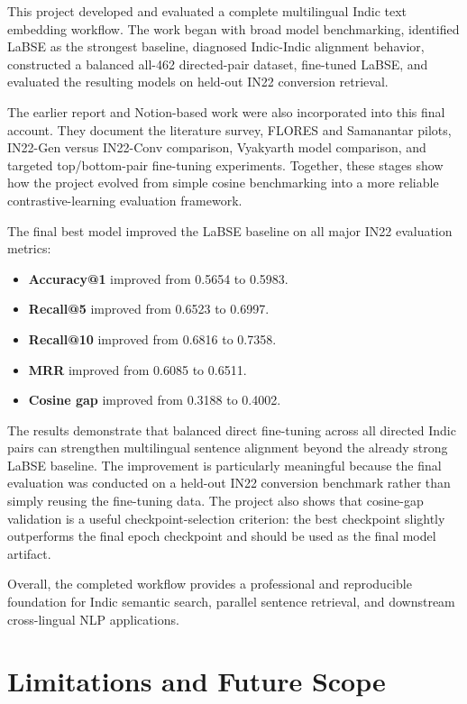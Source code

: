 \documentclass[12pt, a4paper]{article}
\begin{document}
This project developed and evaluated a complete multilingual Indic text embedding workflow. The work began with broad model benchmarking, identified LaBSE as the strongest baseline, diagnosed Indic-Indic alignment behavior, constructed a balanced all-462 directed-pair dataset, fine-tuned LaBSE, and evaluated the resulting models on held-out IN22 conversion retrieval.

The earlier report and Notion-based work were also incorporated into this final account. They document the literature survey, FLORES and Samanantar pilots, IN22-Gen versus IN22-Conv comparison, Vyakyarth model comparison, and targeted top/bottom-pair fine-tuning experiments. Together, these stages show how the project evolved from simple cosine benchmarking into a more reliable contrastive-learning evaluation framework.

The final best model improved the LaBSE baseline on all major IN22 evaluation metrics:

\begin{itemize}[leftmargin=1.5cm, itemsep=4pt]
  \item \textbf{Accuracy@1} improved from 0.5654 to 0.5983.
  \item \textbf{Recall@5} improved from 0.6523 to 0.6997.
  \item \textbf{Recall@10} improved from 0.6816 to 0.7358.
  \item \textbf{MRR} improved from 0.6085 to 0.6511.
  \item \textbf{Cosine gap} improved from 0.3188 to 0.4002.
\end{itemize}

The results demonstrate that balanced direct fine-tuning across all directed Indic pairs can strengthen multilingual sentence alignment beyond the already strong LaBSE baseline. The improvement is particularly meaningful because the final evaluation was conducted on a held-out IN22 conversion benchmark rather than simply reusing the fine-tuning data. The project also shows that cosine-gap validation is a useful checkpoint-selection criterion: the best checkpoint slightly outperforms the final epoch checkpoint and should be used as the final model artifact.

Overall, the completed workflow provides a professional and reproducible foundation for Indic semantic search, parallel sentence retrieval, and downstream cross-lingual NLP applications.

\section{Limitations and Future Scope}
\end{document}
